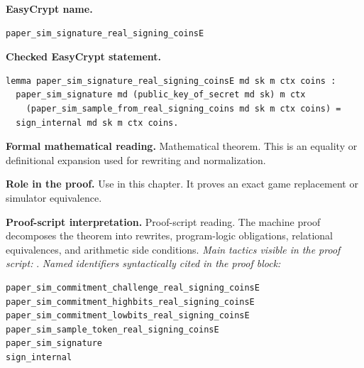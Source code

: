 \begin{formaltheorem}
\noindent\textbf{EasyCrypt name.}
\begin{lstlisting}[language=EasyCrypt,basicstyle=\ttfamily\scriptsize]
paper_sim_signature_real_signing_coinsE
\end{lstlisting}
\noindent\textbf{Checked EasyCrypt statement.}
\begin{lstlisting}[language=EasyCrypt,basicstyle=\ttfamily\scriptsize]
lemma paper_sim_signature_real_signing_coinsE md sk m ctx coins :
  paper_sim_signature md (public_key_of_secret md sk) m ctx
    (paper_sim_sample_from_real_signing_coins md sk m ctx coins) =
  sign_internal md sk m ctx coins.
\end{lstlisting}
\noindent\textbf{Formal mathematical reading.}
Mathematical theorem. This is an equality or definitional expansion used for rewriting and normalization.

\noindent\textbf{Role in the proof.}
Use in this chapter. It proves an exact game replacement or simulator equivalence.

\noindent\textbf{Proof-script interpretation.}
Proof-script reading. The machine proof decomposes the theorem into rewrites, program-logic obligations, relational equivalences, and arithmetic side conditions.
\emph{Main tactics visible in the proof script:} .
\emph{Named identifiers syntactically cited in the proof block:}
\begin{lstlisting}[language=EasyCrypt,basicstyle=\ttfamily\scriptsize]
paper_sim_commitment_challenge_real_signing_coinsE
paper_sim_commitment_highbits_real_signing_coinsE
paper_sim_commitment_lowbits_real_signing_coinsE
paper_sim_sample_token_real_signing_coinsE
paper_sim_signature
sign_internal
\end{lstlisting}

\end{formaltheorem}


